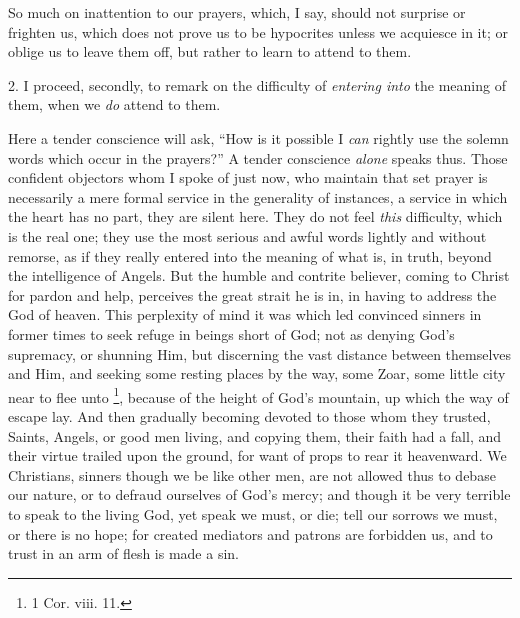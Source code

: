 So much on inattention to our prayers, which, I say,
should not surprise or frighten us, which does not prove
us to be hypocrites unless we acquiesce in it; or oblige
us to leave them off, but rather to learn to attend to
them.

2. I proceed, secondly, to remark on the difficulty of
\emph{entering into} the meaning of them, when we \emph{do}
attend to them.

Here a tender conscience will ask, ``How is it
possible I \emph{can} rightly use the solemn words which
occur in the prayers?'' A tender conscience \emph{alone}
speaks thus. Those confident objectors whom I spoke of
just now, who maintain that set prayer is necessarily a
mere formal service in the generality of instances, a
service in which the heart has no part, they are silent
here. They do not feel \emph{this} difficulty, which is
the real one; they use the most serious and awful words
lightly and without remorse, as if they really entered
into the meaning of what is, in truth, beyond the
intelligence of Angels. But the humble and contrite
believer, coming to Christ for pardon and help, perceives
the great strait he is in, in having to address the God
of heaven. This perplexity of mind it was which led
convinced sinners in former times to seek refuge in
beings short of God; not as denying God's supremacy, or
shunning Him, but discerning the vast distance between
themselves and Him, and seeking some resting places by
the way, some Zoar, some little city near to flee unto \footnote{1 Cor. viii. 11.}, because of the height of God's mountain,
up which the way of escape lay. And then gradually
becoming devoted to those whom they trusted, Saints,
Angels, or good men living, and copying them, their faith
had a fall, and their virtue trailed upon the ground, for
want of props to rear it heavenward. We Christians,
sinners though we be like other men, are not allowed thus
to debase our nature, or to defraud ourselves of God's
mercy; and though it be very terrible to speak to the
living God, yet speak we must, or die; tell our sorrows
we must, or there is no hope; for created mediators and
patrons are forbidden us, and to trust in an arm of flesh
is made a sin.

